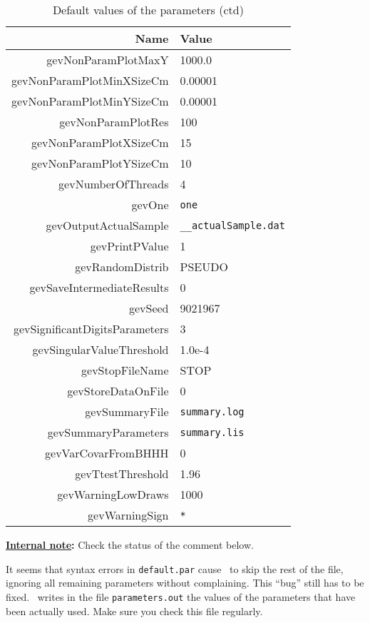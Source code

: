 \documentclass[12pt]{memoir}
\newcommand{\note}[1]{
\begin{framed}{}%
\textbf{\underline{Internal note}:} #1
\end{framed}}
\begin{document}
\begin{table}
\begin{center}
\begin{tabular}{rl}
Name & Value \\
\hline
gevNonParamPlotMaxY & 1000.0 \\
gevNonParamPlotMinXSizeCm & 0.00001  \\
gevNonParamPlotMinYSizeCm & 0.00001 \\
gevNonParamPlotRes & 100 \\
gevNonParamPlotXSizeCm & 15 \\
gevNonParamPlotYSizeCm & 10  \\
gevNumberOfThreads & 4 \\
gevOne & \texttt{one} \\
gevOutputActualSample & \texttt{\_\_actualSample.dat} \\
gevPrintPValue & 1 \\
gevRandomDistrib & PSEUDO \\
gevSaveIntermediateResults & 0 \\
gevSeed & 9021967 \\
gevSignificantDigitsParameters & 3 \\
gevSingularValueThreshold & 1.0e-4 \\
gevStopFileName & STOP \\
gevStoreDataOnFile & 0  \\
gevSummaryFile & \verb+summary.log+\\
gevSummaryParameters & \verb+summary.lis+ \\
gevVarCovarFromBHHH & 0 \\
gevTtestThreshold & 1.96 \\
gevWarningLowDraws & 1000 \\
gevWarningSign & \verb+*+ \\
\end{tabular}
\end{center}
\caption{Default values of the parameters (ctd)}
\end{table}

\note{Check the status of the comment below.}

It seems that syntax errors in \verb+default.par+ cause \BIOGEME\  to skip
the rest of the file, ignoring all remaining parameters without
complaining. This ``bug'' still has to be fixed. \BIOGEME\  writes in the file
\texttt{parameters.out} the values of the parameters that have been actually used. 
Make sure you check this file regularly.
\end{document}
